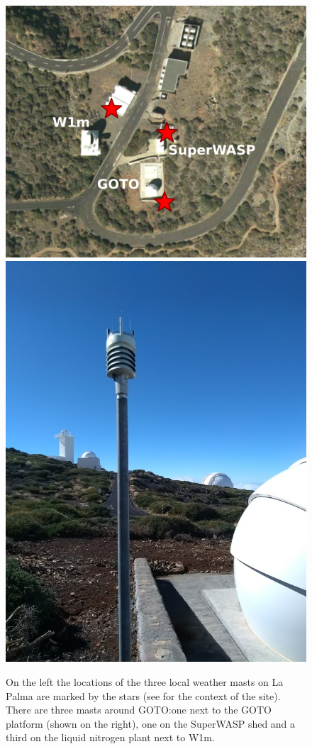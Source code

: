\begin{colsection}
\begin{figure}[t]
    \begin{center}
        \includegraphics[height=0.5\linewidth]{images/orm_warwick.pdf}
        \includegraphics[height=0.5\linewidth]{images/conditions_photo.jpg}
    \end{center}
    \caption[Locations of the three weather masts on La Palma]{
        On the left the locations of the three local weather masts on La Palma are marked by the  stars (see  for the context of the site). There are three masts around GOTO:\@ one next to the GOTO platform (shown on the right), one on the SuperWASP shed and a third on the liquid nitrogen plant next to W1m.
    }\label{fig:conditions}
\end{figure}

\newpage

\end{colsection}


